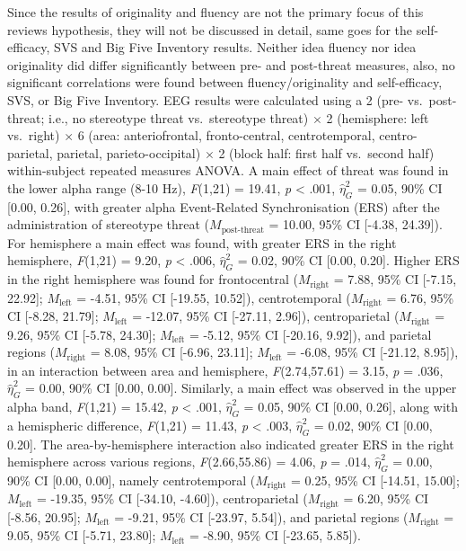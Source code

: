 \documentclass[
  stu,floatsintext]{apa7}
\begin{document}
Since the results of originality and fluency are not the primary focus of this reviews hypothesis, they will not be discussed in detail, same goes for the self-efficacy, SVS and Big Five Inventory results.
Neither idea fluency nor idea originality did differ significantly between pre- and post-threat measures, also, no significant correlations were found between fluency/originality and self-efficacy, SVS, or Big Five Inventory.
EEG results were calculated using a 2 (pre- vs.~post-threat; i.e., no stereotype threat vs.~stereotype threat) \(\times\) 2 (hemisphere: left vs.~right) \(\times\) 6 (area: anteriofrontal, fronto-central, centrotemporal, centro-parietal, parietal, parieto-occipital) \(\times\) 2 (block half: first half vs.~second half) within-subject repeated measures ANOVA.
A main effect of threat was found in the lower alpha range (8-10 Hz), \emph{F}(1,21) = 19.41, \emph{p} \textless{} .001, \(\hat{\eta}^{2}_{G}\) = 0.05, 90\% CI {[}0.00, 0.26{]}, with greater alpha Event-Related Synchronisation (ERS) after the administration of stereotype threat (\(M_{\text{post-threat}}\) = 10.00, 95\% CI {[}-4.38, 24.39{]}).
For hemisphere a main effect was found, with greater ERS in the right hemisphere, \emph{F}(1,21) = 9.20, \emph{p} \textless{} .006, \(\hat{\eta}^{2}_{G}\) = 0.02, 90\% CI {[}0.00, 0.20{]}.
Higher ERS in the right hemisphere was found for frontocentral (\(M_{\text{right}}\) = 7.88, 95\% CI {[}-7.15, 22.92{]}; \(M_{\text{left}}\) = -4.51, 95\% CI {[}-19.55, 10.52{]}), centrotemporal (\(M_{\text{right}}\) = 6.76, 95\% CI {[}-8.28, 21.79{]}; \(M_{\text{left}}\) = -12.07, 95\% CI {[}-27.11, 2.96{]}), centroparietal (\(M_{\text{right}}\) = 9.26, 95\% CI {[}-5.78, 24.30{]}; \(M_{\text{left}}\) = -5.12, 95\% CI {[}-20.16, 9.92{]}), and parietal regions (\(M_{\text{right}}\) = 8.08, 95\% CI {[}-6.96, 23.11{]}; \(M_{\text{left}}\) = -6.08, 95\% CI {[}-21.12, 8.95{]}), in an interaction between area and hemisphere, \emph{F}(2.74,57.61) = 3.15, \emph{p} = .036, \(\hat{\eta}^{2}_{G}\) = 0.00, 90\% CI {[}0.00, 0.00{]}.
Similarly, a main effect was observed in the upper alpha band, \emph{F}(1,21) = 15.42, \emph{p} \textless{} .001, \(\hat{\eta}^{2}_{G}\) = 0.05, 90\% CI {[}0.00, 0.26{]}, along with a hemispheric difference, \emph{F}(1,21) = 11.43, \emph{p} \textless{} .003, \(\hat{\eta}^{2}_{G}\) = 0.02, 90\% CI {[}0.00, 0.20{]}.
The area-by-hemisphere interaction also indicated greater ERS in the right hemisphere across various regions, \emph{F}(2.66,55.86) = 4.06, \emph{p} = .014, \(\hat{\eta}^{2}_{G}\) = 0.00, 90\% CI {[}0.00, 0.00{]}, namely centrotemporal (\(M_{\text{right}}\) = 0.25, 95\% CI {[}-14.51, 15.00{]}; \(M_{\text{left}}\) = -19.35, 95\% CI {[}-34.10, -4.60{]}), centroparietal (\(M_{\text{right}}\) = 6.20, 95\% CI {[}-8.56, 20.95{]}; \(M_{\text{left}}\) = -9.21, 95\% CI {[}-23.97, 5.54{]}), and parietal regions (\(M_{\text{right}}\) = 9.05, 95\% CI {[}-5.71, 23.80{]}; \(M_{\text{left}}\) = -8.90, 95\% CI {[}-23.65, 5.85{]}).
\end{document}
